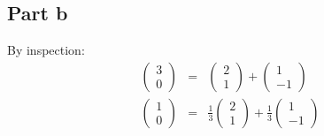 \subsection*{Part b}
By inspection:
\begin{eqnarray*}
\left(\begin{array}{c}
3 \\
0
\end{array}\right) &=& 
\left(\begin{array}{c}
2 \\
1
\end{array}\right)
+
\left(\begin{array}{c}
1 \\
-1
\end{array}\right) \\
\left(\begin{array}{c}
1 \\
0
\end{array}\right) &=& 
\frac{1}{3}\left(\begin{array}{c}
2 \\
1
\end{array}\right)
+
\frac{1}{3}\left(\begin{array}{c}
1 \\
-1
\end{array}\right)
\end{eqnarray*}
